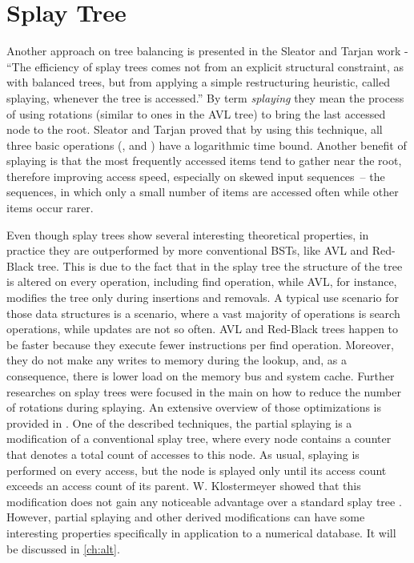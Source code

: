 \section{Splay Tree}

Another approach on tree balancing is presented in the Sleator and Tarjan work\cite{splay_tree} - ``The efficiency of splay trees comes not from an explicit structural constraint, as with balanced trees, but from applying a simple restructuring heuristic, called splaying, whenever the tree is accessed.'' By term \emph{splaying} they mean the process of using rotations (similar to ones in the AVL tree) to bring the last accessed node to the root. Sleator and Tarjan proved that by using this technique, all three basic operations (\findop, \insertop and \removeop) have a logarithmic time bound. Another benefit of splaying is that the most frequently accessed items tend to gather near the root, therefore improving access speed, especially on skewed input sequences~-- the sequences, in which only a small number of items are accessed often while other items occur rarer.

Even though splay trees show several interesting theoretical properties, in practice they are outperformed by more conventional BSTs, like AVL and Red-Black tree\cite{splay_overview}. This is due to the fact that in the splay tree the structure of the tree is altered on every operation, including find operation, while AVL, for instance, modifies the tree only during insertions and removals. A typical use scenario for those data structures is a scenario, where a vast majority of operations is search operations, while updates are not so often. AVL and Red-Black trees happen to be faster because they execute fewer instructions per find operation. Moreover, they do not make any writes to memory during the lookup, and, as a consequence, there is lower load on the memory bus and system cache. Further researches on splay trees were focused in the main on how to reduce the number of rotations during splaying. An extensive overview of those optimizations is provided in \cite{splay_overview}. One of the described techniques, the partial splaying is a modification of a conventional splay tree, where every node contains a counter that denotes a total count of accesses to this node. As usual, splaying is performed on every access, but the node is splayed only until its access count exceeds an access count of its parent. W. Klostermeyer showed that this modification does not gain any noticeable advantage over a standard splay tree \cite{partial_splaying}. However, partial splaying and other derived modifications can have some interesting properties specifically in application to a numerical database. It will be discussed in \cref{ch:alt}.

